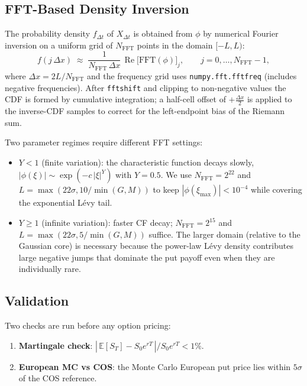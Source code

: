 \documentclass[11pt,a4paper]{article}
\newcommand{\E}{\mathbb{E}}
\begin{document}
\subsection{FFT-Based Density Inversion}

The probability density $f_{\Delta t}$ of $X_{\Delta t}$ is obtained from $\phi$
by numerical Fourier inversion on a uniform grid of $N_{\mathrm{FFT}}$ points
in the domain $[-L, L)$:
\[
  f(j\,\Delta x) \;\approx\; \frac{1}{N_{\mathrm{FFT}}\,\Delta x}\,
  \operatorname{Re}\!\bigl[\mathrm{FFT}(\phi)\bigr]_j,
  \qquad
  j = 0,\ldots,N_{\mathrm{FFT}}-1,
\]
where $\Delta x = 2L/N_{\mathrm{FFT}}$ and the frequency grid uses
\texttt{numpy.fft.fftfreq} (includes negative frequencies).
After \texttt{fftshift} and clipping to non-negative values the CDF is formed by
cumulative integration; a half-cell offset of $+\tfrac{\Delta x}{2}$ is applied
to the inverse-CDF samples to correct for the left-endpoint bias of the Riemann
sum.

Two parameter regimes require different FFT settings:
\begin{itemize}
  \item $Y < 1$ (finite variation): the characteristic function decays slowly,
    $|\phi(\xi)| \sim \exp(-c\,|\xi|^Y)$ with $Y = 0.5$.  We use
    $N_{\mathrm{FFT}} = 2^{22}$ and $L = \max(22\sigma, 10/\min(G,M))$ to keep
    $|\phi(\xi_{\max})| < 10^{-4}$ while covering the exponential Lévy tail.
  \item $Y \geq 1$ (infinite variation): faster CF decay; $N_{\mathrm{FFT}} = 2^{15}$
    and $L = \max(22\sigma, 5/\min(G,M))$ suffice.  The larger domain
    (relative to the Gaussian core) is necessary because the power-law Lévy
    density contributes large negative jumps that dominate the put payoff even
    when they are individually rare.
\end{itemize}

\subsection{Validation}

Two checks are run before any option pricing:
\begin{enumerate}
  \item \textbf{Martingale check}: $|\,\E[S_T] - S_0 e^{rT}\,|/S_0 e^{rT} < 1\%$.
  \item \textbf{European MC vs COS}: the Monte Carlo European put price lies
    within $5\sigma$ of the COS reference.
\end{enumerate}
\end{document}
